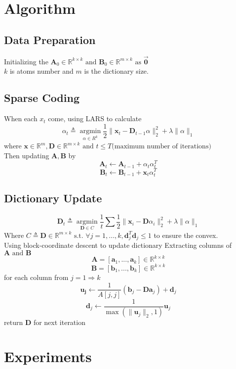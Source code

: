 \documentclass[UTF8]{article}
\begin{document}
\section{Algorithm}

\subsection{Data Preparation}

Initializing the $\bm{A}_0 \in \mathbb{R}^{k \times k} \text{ and } \bm{B}_0 \in \mathbb{R}^{m \times k} \text{ as } \vec{\bm{0}} $\\
$k$ is atoms number and $m$ is the dictionary size.

\subsection{Sparse Coding}
When each $x_t$ come, using LARS\cite{scikit-learn} to calculate
\[
	\alpha_t \triangleq \mathop{\arg\min}\limits_{\alpha\in R^k} \frac{1}{2} \| \bm{x}_t - \bm{D}_{t-1} \alpha  \|^2_2 + \lambda \|\alpha\|_1
\]
where $\bm{x} \in \mathbb{R}^{m}, \bm{D} \in \mathbb{R}^{m \times k} \text{ and } t \leq T \text{(maximum number of iterations)}$
\\
Then updating $\bm{A}, \bm{B}$ by
\[\bm{A}_t \leftarrow \bm{A}_{t-1} + \alpha_t \alpha_t^T\]
\[\bm{B}_t \leftarrow \bm{B}_{t-1} + \bm{x}_t \alpha_t^T\]

\subsection{Dictionary Update}
\[\bm{D}_t \triangleq \mathop{\arg\min}\limits_{\bm{D} \in C} \frac{1}{t} \sum{ \frac{1}{2} \| \bm{x}_i - \bm{D} \alpha_i  \|^2_2 + \lambda \|\alpha\|_1}
\]
Where $C \triangleq {\bm{D} \in \mathbb{R}^{m \times k} \text{ s.t. } \forall j = 1, ..., k, \bm{d}_j^T\bm{d}_j \leq 1}$ to ensure the convex.
\\
Using block-coordinate descent to update dictionary
Extracting columns of $\bm{A} \text{ and } \bm{B}$
\[\bm{A} = [\bm{a}_1, ..., \bm{a}_k] \in \mathbb{R}^{k \times k}\]
\[\bm{B} = [\bm{b}_1, ..., \bm{b}_k] \in \mathbb{R}^{k \times k}\]
for each column from $j = 1 \Rightarrow k$
\[\bm{u_j} \leftarrow \frac{1}{A[j, j]}(\bm{b}_j - \bm{Da}_j) + \bm{d}_j\]
\[\bm{d}_j \leftarrow \frac{1}{\max(\|\bm{u}_j\|_2, 1)}\bm{u}_j\]
return $\bm{D}$ for next iteration


\section{Experiments}
\end{document}
